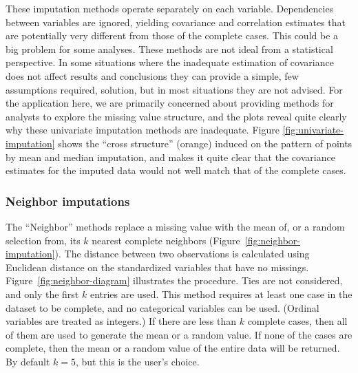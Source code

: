 \documentclass[article]{jss}
\begin{document}
These imputation methods operate separately on each variable.
Dependencies between variables are ignored, yielding covariance
and correlation estimates that are potentially very different
from those of the complete cases. This could be a big problem
for some analyses. These methods are not ideal from a statistical
perspective.  In some situations where the inadequate estimation
of covariance does not affect results and conclusions they can
provide a simple, few assumptions required, solution, but in most
situations they are not advised. For the application here, we are
primarily concerned about providing methods for analysts to
explore the missing value structure, and the plots reveal quite
clearly why these univariate imputation methods are inadequate.
Figure \ref{fig:univariate-imputation} shows the ``cross structure''
(orange) induced on the pattern of points by mean and median
imputation, and makes it quite clear that the covariance estimates
for the imputed data would not well match that of the complete cases. 

\subsubsection{Neighbor imputations}


The ``Neighbor'' methods replace a missing value with the mean of,
or a random selection from, its $k$ nearest complete neighbors
(Figure~\ref{fig:neighbor-imputation}). The distance between two
observations is calculated using Euclidean distance on the
standardized variables that have no missings.
Figure~\ref{fig:neighbor-diagram} illustrates the procedure.
Ties are not considered, and only the first $k$ entries are used.
This method requires at least one case in the dataset to be
complete, and no categorical variables can be used. (Ordinal
variables are treated as integers.) If there are less than $k$
complete cases, then all of them are used to generate the mean
or a random value. If none of the cases are complete, then the
mean or a random value of the entire data will be returned. By
default $k=5$, but this is the user's choice.
\end{document}
